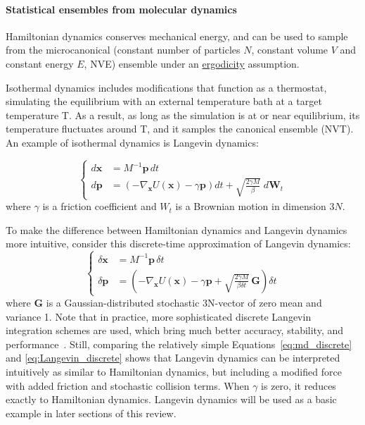 \documentclass[9pt,review]{livecoms}
\newcommand{\vx}{\mathbf{x}}
\newcommand{\vp}{\mathbf{p}}
\begin{document}
\hypertarget{ref:Ensemble} {\paragraph{Statistical ensembles from molecular dynamics}}
Hamiltonian dynamics conserves mechanical energy, and can be used to sample from the microcanonical (constant number of particles $N$, constant volume $V$ and constant energy $E$, NVE) ensemble under an \hyperlink{ref:ergodic} {ergodicity} assumption.

Isothermal dynamics includes modifications that function as a thermostat, simulating the equilibrium with an external temperature bath at a target temperature T.
As a result, as long as the simulation is at or near equilibrium, its temperature fluctuates around T, and it samples the canonical ensemble (NVT).
An example of isothermal dynamics is \hypertarget{ref:Langevin} {Langevin dynamics}:

\begin{equation}
\left\{
\begin{array}{ll}
    d\vx &= M^{-1} \vp \,  dt \\
    d\vp &= \left(-\nabla_\vx U(\vx) - \gamma \vp \right) dt
    + \sqrt{ \frac{2 \gamma M}{\beta}} \; d\mathbf{W}_t
\end{array}
\right.
\end{equation}
where $\gamma$ is a friction coefficient and ${W}_t$ is a Brownian motion in dimension $3N$.

To make the difference between Hamiltonian dynamics and Langevin dynamics more intuitive, consider this discrete-time approximation of Langevin dynamics:
\begin{equation}
\left\{
\begin{array}{ll}
    \delta\vx &= M^{-1} \vp \, \delta t \\
    \delta\vp &= \left(-\nabla_\vx U(\vx) - \gamma \vp + \sqrt{ \frac{2 \gamma M}{ \beta \delta t}} \, \mathbf{G} \right) \delta t
    \label{eq:Langevin_discrete}
\end{array}
\right.
\end{equation}
where $\mathbf{G}$ is a Gaussian-distributed stochastic 3N-vector of zero mean and variance 1.
Note that in practice, more sophisticated discrete Langevin integration schemes are used, which bring much better accuracy, stability, and performance~\cite{Skeel2002, Leimkuhler2012}.
Still, comparing the relatively simple Equations~\ref{eq:md_discrete} and \ref{eq:Langevin_discrete} shows that Langevin dynamics can be interpreted intuitively as similar to Hamiltonian dynamics, but including a modified force with added friction and stochastic collision terms. When $\gamma$ is zero, it reduces exactly to Hamiltonian dynamics.
Langevin dynamics will be used as a basic example in later sections of this review.
\end{document}
